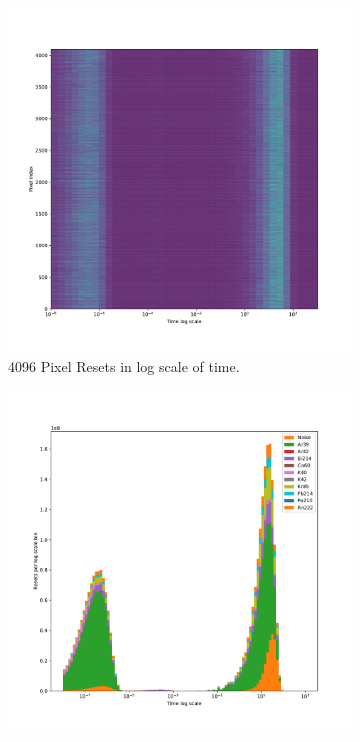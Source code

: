 \begin{figure}
\centering
\begin{subfigure}{.5\textwidth}
  \centering
  \includegraphics[width=\textwidth]{images/radiogenicRTDtimescale.pdf}
  \caption{4096 Pixel Resets in log scale of time.}
\end{subfigure}%
\begin{subfigure}{.5\textwidth}
  \centering
  \includegraphics[width=\textwidth]{images/radiogenicRTDtimescale_stack_1d_noise.pdf}

\end{subfigure}
\end{figure}
